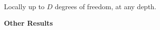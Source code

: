 \documentclass[portrait,a0b,final,a4resizeable]{include/a0poster}
\def\jointspacing{\vspace{0.3in}}
\begin{document}
\begin{poster}
\begin{multicols}{2}
\jointspacing
Locally up to $D$ degrees of freedom, at any depth.











%
%
%

\end{multicols}


\vspace*{3cm}

\begin{center}
\begin{pcolumn}{1.03}

{}
{
  \begin{center}
    {\sffamily \VeryHuge \textbf{Other Results}}
  \end{center}
}
\end{pcolumn}
\end{center}




\begin{multicols}{2}




\end{multicols}
\end{poster}
\end{document}
